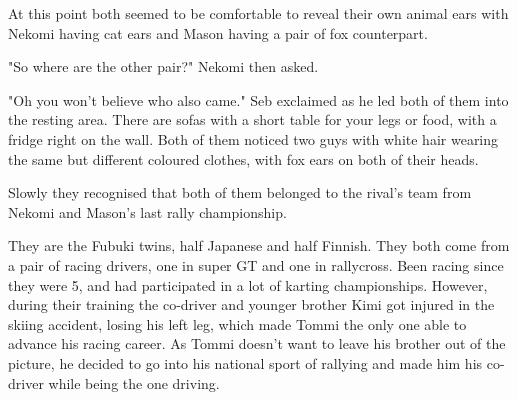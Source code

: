 At this point both seemed to be comfortable to reveal their own animal ears with Nekomi having cat ears and Mason having a pair of fox counterpart. 

"So where are the other pair?" Nekomi then asked. 

"Oh you won't believe who also came." Seb exclaimed as he led both of them into the resting area. 
There are sofas with a short table for your legs or food, with a fridge right on the wall. 
Both of them noticed two guys with white hair wearing the same but different coloured clothes, with fox ears on both of their heads. 

Slowly they recognised that both of them belonged to the rival's team from Nekomi and Mason's last rally championship. 

They are the Fubuki twins, half Japanese and half Finnish. 
They both come from a pair of racing drivers, one in super GT and one in rallycross. 
Been racing since they were 5, and had participated in a lot of karting championships. 
However, during their training the co-driver and younger brother Kimi got injured in the skiing accident, losing his left leg, which made Tommi the only one able to advance his racing career. 
As Tommi doesn't want to leave his brother out of the picture, he decided to go into his national sport of rallying and made him his co-driver while being the one driving. 


